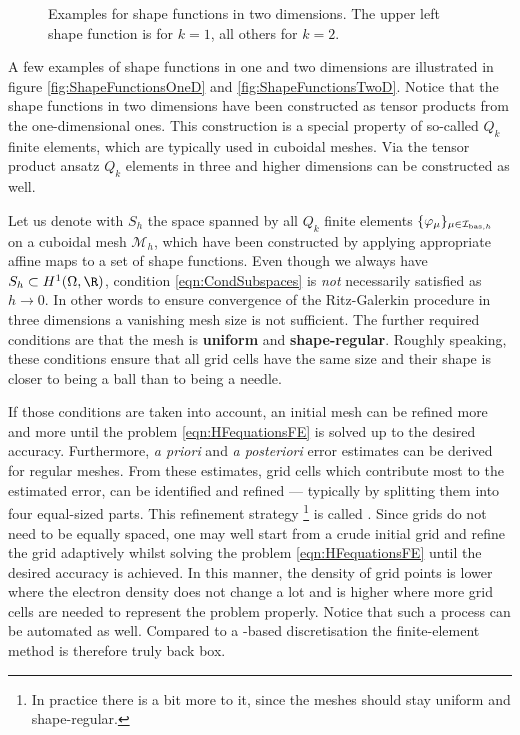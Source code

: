 \begin{figure}
	\centering
	\caption[Examples for shape functions in two dimensions]
	{
		Examples for shape functions in two dimensions.
		The upper left shape function is for $k=1$,
		all others for $k=2$.
	}
	\label{fig:ShapeFunctionsTwoD}
\end{figure}
%
A few examples of shape functions in one and two dimensions are illustrated
in figure \ref{fig:ShapeFunctionsOneD} and \vref{fig:ShapeFunctionsTwoD}.
Notice that the shape functions in two dimensions
have been constructed as tensor products from the one-dimensional ones.
This construction is a special property of so-called $Q_k$ finite elements,
which are typically used in cuboidal meshes.
Via the tensor product ansatz $Q_k$ elements
in three and higher dimensions can be constructed as well.

Let us denote with $S_h$ the
space spanned by all $Q_k$ finite elements $\{\varphi_\mu\}_{\mu\in\mathcal{I}_{\text{bas},h}}$
on a cuboidal mesh $\mathcal{M}_h$,
which have been constructed by applying
appropriate affine maps to a set of shape functions.
Even though we always have $S_h \subset H^1(\Omega, \R)$,
condition \eqref{eqn:CondSubspaces}
is \emph{not} necessarily satisfied as $h \to 0$.
In other words to ensure convergence
of the Ritz-Galerkin procedure in three dimensions
a vanishing mesh size is not sufficient.
The further required conditions are that the mesh
is \textbf{uniform} and \textbf{shape-regular}.
Roughly speaking, these conditions ensure that
all grid cells have the same size
and their shape is closer to being a ball than to being a needle.

If those conditions are taken into account,
an initial mesh can be refined more and more
until the \HF problem \eqref{eqn:HFequationsFE}
is solved up to the desired accuracy.
Furthermore, \textit{a priori} and \textit{a posteriori} error estimates
can be derived for regular meshes.
From these estimates, grid cells
which contribute most to the estimated error,
can be identified and refined
--- typically by splitting them into four equal-sized parts.
This refinement strategy%
\footnote{%
In practice there is a bit more to it,
since the meshes should stay uniform and shape-regular.
}
is called .
Since \FE grids do not need to be equally spaced,
one may well start from a crude initial grid
and refine the grid adaptively
whilst solving the problem \eqref{eqn:HFequationsFE}
until the desired accuracy is achieved.
In this manner, the density of grid points
is lower where the electron density does not change a lot and is higher
where more grid cells are needed to represent the problem properly.
Notice that such a process can be automated as well.
Compared to a \cGTO-based discretisation
the finite-element method is therefore truly back box.

